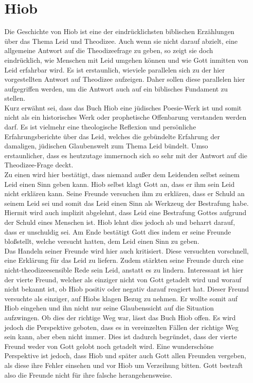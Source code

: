 \section{Hiob}
Die Geschichte von Hiob ist eine der eindrücklichsten biblischen Erzählungen über das Thema Leid und Theodizee. Auch wenn sie nicht darauf abzielt, eine allgemeine Antwort auf die Theodizeefrage zu geben, so zeigt sie doch eindrücklich, wie Menschen mit Leid umgehen können und wie Gott inmitten von Leid erfahrbar wird. Es ist erstaunlich, wieviele parallelen sich zu der hier vorgestellten Antwort auf Theodizee aufzeigen. Daher sollen diese parallelen hier aufgegriffen werden, um die Antwort auch auf ein biblisches Fundament zu stellen.\\

Kurz erwähnt sei, dass das Buch Hiob eine jüdisches Poesie-Werk ist und somit nicht als ein historisches Werk oder prophetische Offenbarung verstanden werden darf. Es ist vielmehr eine theologische Reflexion und persönliche Erfahrungsberichte über das Leid, welches die gebündelte Erfahrung der damaligen, jüdischen Glaubenswelt zum Thema Leid bündelt. Umso erstaunlicher, dass es heutzutage immernoch sich so sehr mit der Antwort auf die Theodizee-Frage deckt.\\

Zu einen wird hier bestätigt, dass niemand außer dem Leidenden selbst seinem Leid einen Sinn geben kann. Hiob selbst klagt Gott an, dass er ihm sein Leid nicht erklären kann. Seine Freunde versuchen ihm zu erklären, dass er Schuld an seinem Leid sei und somit das Leid einen Sinn als Werkzeug der Bestrafung habe. Hiermit wird auch implizit abgelehnt, dass Leid eine Bestrafung Gottes aufgrund der Schuld eines Menschen ist. Hiob lehnt dies jedoch ab und beharrt darauf, dass er unschuldig sei. Am Ende bestätigt Gott dies indem er seine Freunde bloßstellt, welche versucht hatten, dem Leid einen Sinn zu geben. \\

Das Handeln seiner Freunde wird hier auch kritisiert. Diese versuchten vorschnell, eine Erklärung für das Leid zu liefern. Zudem stärkten seine Freunde durch eine nicht-theodizeesensible Rede sein Leid, anstatt es zu lindern. Interessant ist hier der vierte Freund, welcher als einziger nicht von Gott getadelt wird und worauf nicht bekannt ist, ob Hiob positiv oder negativ darauf reagiert hat. Dieser Freund versuchte als einziger, auf Hiobs klagen Bezug zu nehmen. Er wollte somit auf Hiob eingehen und ihn nicht nur seine Glaubenssicht auf die Situation aufzwingen. Ob dies der richtige Weg war, lässt das Buch Hiob offen. Es wird jedoch die Perspektive geboten, dass es in vereinzelten Fällen der richtige Weg sein kann, aber eben nicht immer. Dies ist dadurch begründet, dass der vierte Freund weder von Gott gelobt noch getadelt wird. Eine wunderschöne Perspektive ist jedoch, dass Hiob und später auch Gott allen Freunden vergeben, als diese ihre Fehler einsehen und vor Hiob um Verzeihung bitten. Gott bestraft also die Freunde nicht für ihre falsche herangehensweise. \\

